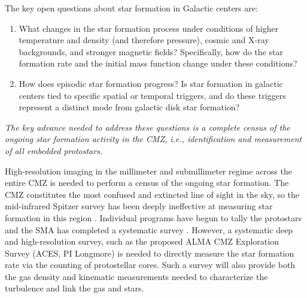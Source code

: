 \documentclass[modern]{aastex62}
\begin{document}
The key open questions about star formation in Galactic centers are:
\begin{enumerate}
    \item What changes in the star formation process under conditions
        of higher temperature and density (and therefore pressure), 
        cosmic and X-ray backgrounds, and stronger magnetic fields?
        Specifically, how do the star formation rate and the initial
        mass function change under these conditions?
    \item How does episodic star formation progress?  Is star formation
        in galactic centers tied to specific spatial or temporal triggers,
        and do these triggers represent a distinct mode from galactic disk star
        formation?
\end{enumerate}


{\it
The key advance needed to address these questions is a complete census of the
ongoing star formation activity in the CMZ, i.e., identification and measurement
of all embedded protostars.}

High-resolution imaging in the millimeter and submillimeter regime across the
entire CMZ is needed to perform a census of the ongoing star formation.  The
CMZ constitutes the most confused and extincted line of sight in the sky, so
the mid-infrared Spitzer survey has been deeply ineffective at measuring star
formation in this region \citep{Koepferl2015a}. Individual programs have
begun to tally the protostars \citep[Walker et al, in prep, Barnes et al, in
prep]{Ginsburg2018a,Lu2019a} and the SMA has completed a systematic
survey \citep{Battersby2017b}. However, a systematic deep and high-resolution
survey, such as the proposed ALMA CMZ Exploration Survey (ACES, PI Longmore) is
needed to directly measure the star formation rate via the counting of
protostellar cores. Such a survey will also provide both the gas density and
kinematic measurements needed to characterize the turbulence and link the gas and
stars.

\end{document}
